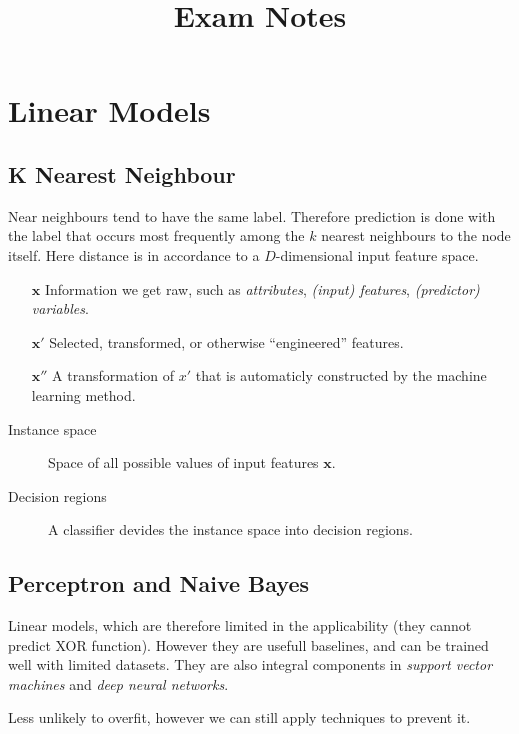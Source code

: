 \title{Exam Notes}

\section{Linear Models}

\subsection{K Nearest Neighbour}

Near neighbours tend to have the same label.
Therefore prediction is done with the label that occurs most frequently among the $k$ nearest neighbours to the node itself.
Here distance is in accordance to a $D$-dimensional input feature space.

\begin{mdframed}[nobreak,frametitle={A Note on Features}]
    \begin{itemize}
        \item[$\mathbf{x}$] Information we get raw, such as \emph{attributes}, \emph{(input) features}, \emph{(predictor) variables}.
        \item[$\mathbf{x'}$] Selected, transformed, or otherwise ``engineered'' features.
        \item[$\mathbf{x''}$] A transformation of $x'$ that is automaticly constructed by the machine learning method.
    \end{itemize}
\end{mdframed}

\begin{description}
    \item[Instance space] Space of all possible values of input features $\mathbf{x}$.
    \item[Decision regions] A classifier devides the instance space into decision regions.
\end{description}

\subsection{Perceptron and Naive Bayes}

Linear models, which are therefore limited in the applicability (they cannot predict XOR function).
However they are usefull baselines, and can be trained well with limited datasets.
They are also integral components in \emph{support vector machines} and \emph{deep neural networks}.

Less unlikely to overfit, however we can still apply techniques to prevent it.

